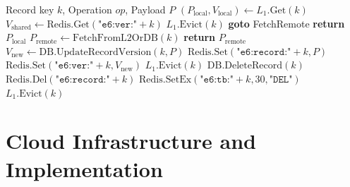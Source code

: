 \documentclass[conference]{IEEEtran}
\begin{document}
\begin{algorithm}[t]
\caption{Synchronized Version Validation \& Invalidation (Tier $E_6$)}
\label{alg:invalidation}
\begin{algorithmic}[1]
\REQUIRE Record key $k$, Operation $op$, Payload $P$
        \STATE $(P_{\text{local}}, V_{\text{local}}) \leftarrow L_1.\text{Get}(k)$
        \STATE $V_{\text{shared}} \leftarrow \text{Redis}.\text{Get}(\texttt{"e6:ver:"} + k)$
            \STATE $L_1.\text{Evict}(k)$ 
            \STATE \textbf{goto} FetchRemote
        \ENDIF
        \STATE \textbf{return} $P_{\text{local}}$ 
    \ENDIF
    \STATE $P_{\text{remote}} \leftarrow \text{FetchFromL2OrDB}(k)$
    \STATE \textbf{return} $P_{\text{remote}}$
    \STATE $V_{\text{new}} \leftarrow \text{DB}.\text{UpdateRecordVersion}(k, P)$
    \STATE $\text{Redis}.\text{Set}(\texttt{"e6:record:"} + k, P)$
    \STATE $\text{Redis}.\text{Set}(\texttt{"e6:ver:"} + k, V_{\text{new}})$
    \STATE {}
    \STATE $L_1.\text{Evict}(k)$
    \STATE $\text{DB}.\text{DeleteRecord}(k)$
    \STATE $\text{Redis}.\text{Del}(\texttt{"e6:record:"} + k)$
    \STATE $\text{Redis}.\text{SetEx}(\texttt{"e6:tb:"} + k, 30, \texttt{"DEL"})$
    \STATE $L_1.\text{Evict}(k)$
\ENDIF
\end{algorithmic}
\end{algorithm}

\section{Cloud Infrastructure and Implementation}
\end{document}
